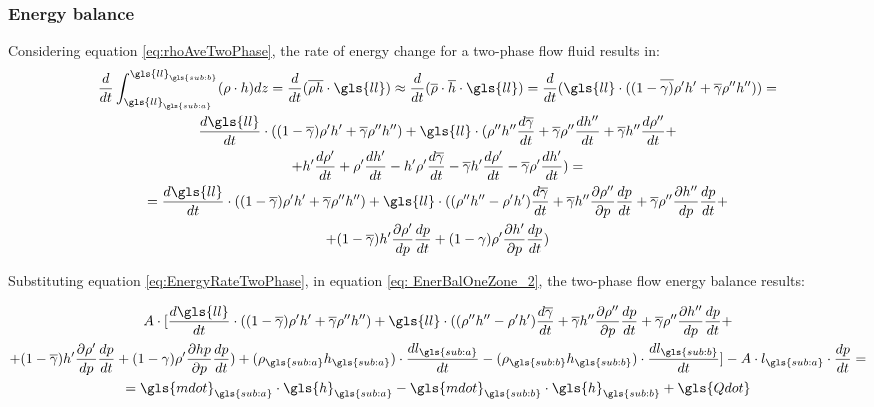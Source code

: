 \documentclass[11pt]{article} %
\begin{document}
\subsubsection{Energy balance}
Considering equation \ref{eq:rhoAveTwoPhase}, the rate of energy change for a two-phase flow fluid results in:
\begin{gather}
\label{eq:RateEnergyTwoPhase}
\frac{d}{dt} \int_{\gls{ll}_{\gls{sub:a}}}^{\gls{ll}_{\gls{sub:b}}} (\rho \cdot h) dz = \frac{d}{dt} ( \overline{\rho h} \cdot \gls{ll}) \approx  \frac{d}{dt} ( \overline{\rho} \cdot \overline{h} \cdot \gls{ll}) = \frac{d}{dt} (\gls{ll} \cdot ((1- \overline{\gamma)}\rhop \hp + \overline{\gamma} \rhopp \hpp)) = \\
\frac{d\gls{ll}}{dt} \cdot ((1-\overline{\gamma}) \rhop \hp  + \overline{\gamma} \rhopp \hpp) + \gls{ll}\cdot(\rhopp \hpp \frac{ d\overline{\gamma}}{dt} + \overline{\gamma} \rhopp \frac{d\hpp}{dt} + \overline{\gamma} \hpp \frac{d\rhopp}{dt}+ \\ + \hp \frac{d \rhop}{dt} + \rhop \frac{d \hp}{dt} - \hp \rhop \frac{d\overline{\gamma}}{dt} - \overline{\gamma} \hp \frac{d \rhop}{dt} - \overline{\gamma} \rhop \frac{d \hp}{dt}) = \\
= \frac{d\gls{ll}}{dt} \cdot ((1-\overline{\gamma}) \rhop \hp  + \overline{\gamma} \rhopp \hpp) + \gls{ll}\cdot((\rhopp \hpp - \rhop \hp ) \frac{d \overline{\gamma}}{dt} + \overline{\gamma}\hpp \frac{\partial \rhopp}{\partial p}\frac{d p}{dt} + \overline{\gamma}\rhopp\frac{\partial \hpp }{dp}\frac{d p}{dt} + \\
+ (1-\overline{\gamma})\hp\frac{\partial \rhop}{dp}\frac{d p}{dt} + (1-\gamma)\rhop\frac{\partial \hp }{\partial p}\frac{d p}{dt})
\label{eq:EnergyRateTwoPhase}
\end{gather}

Substituting equation \ref{eq:EnergyRateTwoPhase}, in equation \ref{eq: EnerBalOneZone_2}, the two-phase flow energy balance results:

\begin{gather}
A \cdot [ \frac{d\gls{ll}}{dt} \cdot ((1-\overline{\gamma}) \rhop \hp  + \overline{\gamma} \rhopp \hpp) + \gls{ll}\cdot((\rhopp \hpp - \rhop \hp ) \frac{d \overline{\gamma}}{dt} + \overline{\gamma}\hpp \frac{\partial \rhopp}{\partial p}\frac{d p}{dt} + \overline{\gamma}\rhopp\frac{\partial \hpp }{dp}\frac{d p}{dt} + \\
+ (1-\overline{\gamma})\hp\frac{\partial \rhop}{dp}\frac{d p}{dt} + (1-\gamma)\rhop\frac{\partial hp }{\partial p}\frac{d p}{dt}) +  (\rho_{\gls{sub:a}} h_{\gls{sub:a}}) \cdot \frac{dl_{\gls{sub:a}} }{dt} - (\rho_{\gls{sub:b}}  h_{\gls{sub:b}}) \cdot \frac{dl_{\gls{sub:b}} }{dt} ] - A \cdot l_{\gls{sub:a}} \cdot \frac{dp}{dt}= \\
= \gls{mdot}_{\gls{sub:a}} \cdot \gls{h}_{\gls{sub:a}} -  \gls{mdot}_{\gls{sub:b}} \cdot \gls{h}_{\gls{sub:b}} + \gls{Qdot}
\label{eq:EnergyBalanceTwoPhase}
\end{gather}
\end{document}
